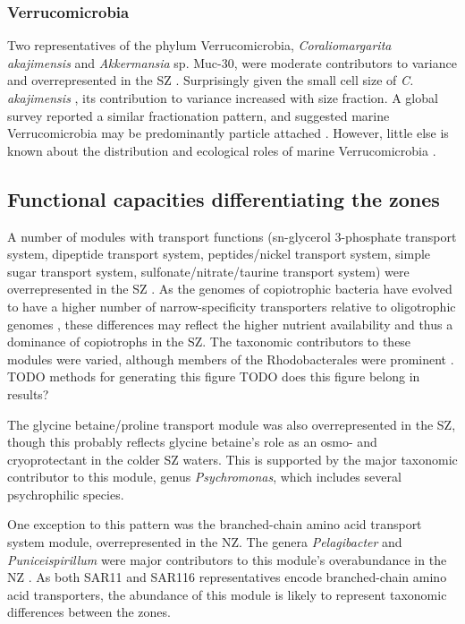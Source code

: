 \subsubsection{Verrucomicrobia}

Two representatives of the phylum Verrucomicrobia, \emph{Coraliomargarita akajimensis} and \emph{Akkermansia} sp. Muc-30, were moderate contributors to variance and overrepresented in the \ac{SZ} .
Surprisingly given the small cell size of \emph{C. akajimensis} \cite{Yoon:2007ic}, its contribution to variance increased with size fraction.
A global survey reported a similar fractionation pattern, and suggested marine Verrucomicrobia may be predominantly particle attached \cite{Freitas:2012jz}.
However, little else is known about the distribution and ecological roles of marine Verrucomicrobia \cite{Freitas:2012jz}.

\subsection{Functional capacities differentiating the zones}

A number of modules with transport functions (sn-glycerol 3-phosphate transport system, dipeptide transport system, peptides/nickel transport system, simple sugar transport system, sulfonate/nitrate/taurine transport system) were overrepresented in the \ac{SZ} .
As the genomes of copiotrophic bacteria have evolved to have a higher number of narrow-specificity transporters relative to oligotrophic genomes \cite{Lauro:2009gx}, these differences may reflect the higher nutrient availability and thus a dominance of copiotrophs in the \ac{SZ}.
The taxonomic contributors to these modules were varied, although members of the Rhodobacterales were prominent .
TODO methods for generating this figure
TODO does this figure belong in results?

The glycine betaine/proline transport module was also overrepresented in the \ac{SZ}, though this probably reflects glycine betaine's role as an osmo- and cryoprotectant in the colder \ac{SZ} waters.
This is supported by the major taxonomic contributor to this module, genus \emph{Psychromonas}, which includes several psychrophilic species. 

One exception to this pattern was the branched-chain amino acid transport system module, overrepresented in the \ac{NZ}. 
The genera \emph{Pelagibacter} and \emph{Puniceispirillum} were major contributors to this module's overabundance in the \ac{NZ} .
As both SAR11 \cite{Giovannoni:2005ib} and SAR116 \cite{Grote:2011dm} representatives encode branched-chain amino acid transporters, the abundance of this module is likely to represent taxonomic differences between the zones.

